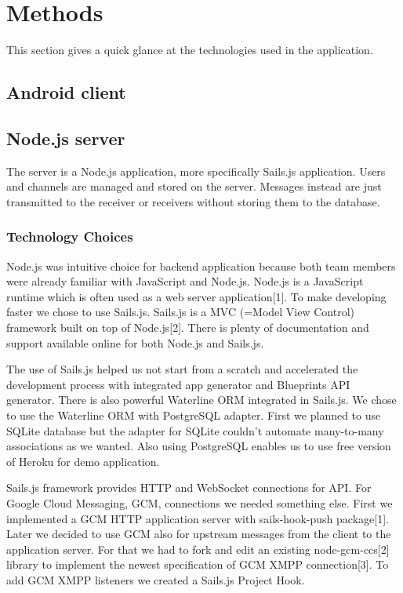 \section{Methods}
This section gives a quick glance at the technologies used in the application.

\subsection{Android client}

\subsection{Node.js server}
The server is a Node.js application, more specifically Sails.js application. Users and channels are managed and stored on the server.
Messages instead are just transmitted to the receiver or receivers without storing them to the database. 

\subsubsection{Technology Choices}
Node.js was intuitive choice for backend application because both team members were already familiar with JavaScript and Node.js.
Node.js is a JavaScript runtime which is often used as a web server application[1]. To make developing faster we chose to use Sails.js.
Sails.js is a MVC (=Model View Control) framework built on top of Node.js[2]. There is plenty of documentation and support available
online for both Node.js and Sails.js.

The use of Sails.js helped us not start from a scratch and accelerated the development process with integrated app generator and
Blueprints API generator. There is also powerful Waterline ORM integrated in Sails.js. We chose to use the Waterline ORM with PostgreSQL
adapter. First we planned to use SQLite database but the adapter for SQLite couldn't automate many-to-many associations as we wanted.
Also using PostgreSQL enables us to use free version of Heroku for demo application.

Sails.js framework provides HTTP and WebSocket connections for API. For Google Cloud Messaging, GCM, connections we needed something
else. First we implemented a GCM HTTP application server with sails-hook-push package[1]. Later we decided to use GCM also for
upstream messages from the client to the application server. For that we had to fork and edit an existing node-gcm-ccs[2] library to
implement the newest
specification of GCM XMPP connection[3]. To add GCM XMPP listeners we created a Sails.js Project Hook.

